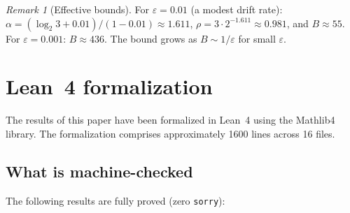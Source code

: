 \documentclass[manuscript]{aomart}
\theoremstyle{plain}
\theoremstyle{definition}
\theoremstyle{remark}
\newtheorem{remark}[theorem]{Remark}
\numberwithin{equation}{section}
\begin{document}
\begin{remark}[Effective bounds]\label{rem:effective}
For $\varepsilon = 0.01$ (a modest drift rate):
$\alpha = (\log_2 3 + 0.01)/(1 - 0.01) \approx 1.611$,
$\rho = 3 \cdot 2^{-1.611} \approx 0.981$,
and $B \approx 55$.
For $\varepsilon = 0.001$:
$B \approx 436$.
The bound grows as $B \sim 1/\varepsilon$ for small $\varepsilon$.
\end{remark}

\section{Lean~4 formalization}\label{sec:lean}

The results of this paper have been formalized in Lean~4 using the
Mathlib4 library.  The formalization comprises approximately 1600
lines across 16 files.

\subsection{What is machine-checked}

The following results are fully proved (zero \texttt{sorry}):
\end{document}
